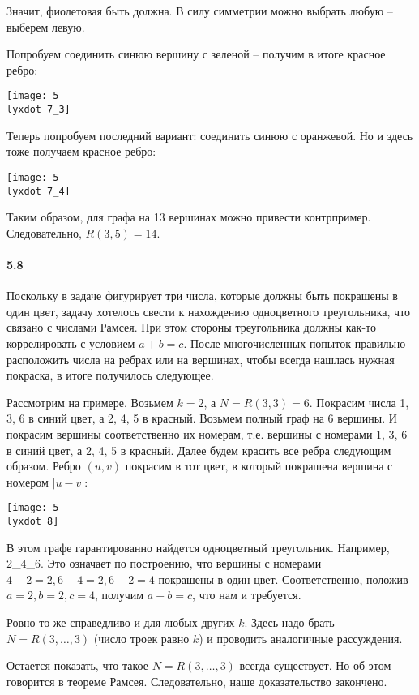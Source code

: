 \documentclass[russian]{article}
\newcommand{\lyxdot}{.}
\begin{document}
Значит, фиолетовая быть должна. В силу симметрии можно выбрать любую
-- выберем левую.

Попробуем соединить синюю вершину с зеленой -- получим в итоге красное
ребро:

\begin{center}
\texttt{[image: 5\\lyxdot 7\_3]}
\par\end{center}

Теперь попробуем последний вариант: соединить синюю с оранжевой. Но
и здесь тоже получаем красное ребро:

\begin{center}
\texttt{[image: 5\\lyxdot 7\_4]}
\par\end{center}

Таким образом, для графа на 13 вершинах можно привести контрпример.
Следовательно, $R(3,5)=14$.


\paragraph{5.8}

Поскольку в задаче фигурирует три числа, которые должны быть покрашены
в один цвет, задачу хотелось свести к нахождению одноцветного треугольника,
что связано с числами Рамсея. При этом стороны треугольника должны
как-то коррелировать с условием $a+b=c$. После многочисленных попыток
правильно расположить числа на ребрах или на вершинах, чтобы всегда
нашлась нужная покраска, в итоге получилось следующее.

Рассмотрим на примере. Возьмем $k=2$, а $N=R(3,3)=6$. Покрасим числа
1, 3, 6 в синий цвет, а 2, 4, 5 в красный. Возьмем полный граф на
6 вершины. И покрасим вершины соответственно их номерам, т.е. вершины
с номерами 1, 3, 6 в синий цвет, а 2, 4, 5 в красный. Далее будем
красить все ребра следующим образом. Ребро $(u,v)$ покрасим в тот
цвет, в который покрашена вершина с номером $|u-v|$:

\begin{center}
\texttt{[image: 5\\lyxdot 8]}
\par\end{center}

В этом графе гарантированно найдется одноцветный треугольник. Например,
2\_4\_6. Это означает по построению, что вершины с номерами $4-2=2,6-4=2,6-2=4$
покрашены в один цвет. Соответственно, положив $a=2,b=2,c=4$, получим
$a+b=c$, что нам и требуется.

Ровно то же справедливо и для любых других $k$. Здесь надо брать
$N=R(3,\dots,3)$ (число троек равно $k$) и проводить аналогичные
рассуждения.

Остается показать, что такое $N=R(3,\dots,3)$ всегда существует.
Но об этом говорится в теореме Рамсея. Следовательно, наше доказательство
закончено.
\end{document}
